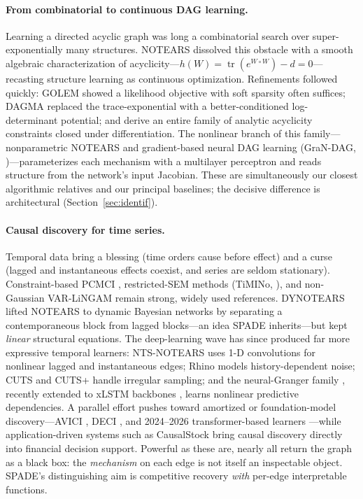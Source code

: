 \paragraph{From combinatorial to continuous DAG learning.} Learning a directed
acyclic graph was long a combinatorial search over super-exponentially many
structures. NOTEARS \citep{Zheng2018} dissolved this obstacle with a smooth
algebraic characterization of acyclicity---$h(W)=\operatorname{tr}(e^{W\circ
W})-d=0$---recasting structure learning as continuous optimization. Refinements
followed quickly: GOLEM \citep{ng2020golem} showed a likelihood objective with
soft sparsity often suffices; DAGMA \citep{Bello2022} replaced the
trace-exponential with a better-conditioned log-determinant potential; and
\citet{zhang2025analytic} derive an entire family of analytic acyclicity
constraints closed under differentiation. The nonlinear branch of this
family---nonparametric NOTEARS \citep{zheng2020sparse} and gradient-based neural
DAG learning (GraN-DAG, \citealt{lachapelle2020grandag})---parameterizes each
mechanism with a multilayer perceptron and reads structure from the network's
input Jacobian. These are simultaneously our closest algorithmic relatives and
our principal baselines; the decisive difference is architectural
(Section~\ref{sec:identif}).

\paragraph{Causal discovery for time series.} Temporal data bring a blessing
(time orders cause before effect) and a curse (lagged and instantaneous effects
coexist, and series are seldom stationary). Constraint-based PCMCI
\citep{Runge2019}, restricted-SEM methods (TiMINo, \citealt{Peters2013TiMINo}),
and non-Gaussian VAR-LiNGAM \citep{Hyvarinen2010} remain strong, widely used
references. DYNOTEARS \citep{Pamfil2020} lifted NOTEARS to dynamic Bayesian
networks by separating a contemporaneous block from lagged blocks---an idea SPADE
inherits---but kept \emph{linear} structural equations. The deep-learning wave has
since produced far more expressive temporal learners: NTS-NOTEARS
\citep{sun2023ntsnotears} uses 1-D convolutions for nonlinear lagged and
instantaneous edges; Rhino \citep{Gong2023Rhino} models history-dependent noise;
CUTS and CUTS+ \citep{Cheng2023CUTS,cheng2024cutsplus} handle irregular sampling;
and the neural-Granger family \citep{Tank2021,Shojaie2022,zhou2024jacobian},
recently extended to xLSTM backbones \citep{poonia2025gcxlstm}, learns nonlinear
predictive dependencies. A parallel effort pushes toward amortized or
foundation-model discovery---AVICI \citep{lorch2022avici}, DECI
\citep{geffner2022deci}, and 2024--2026 transformer-based learners
\citep{stein2024causalpretraining,shen2024stic,misiakos2025spinsvar,faruque2026ttcd,fesanghary2026grace}---while
application-driven systems such as CausalStock \citep{li2024causalstock} bring
causal discovery directly into financial decision support. Powerful as these are,
nearly all return the graph as a black box: the \emph{mechanism} on each edge is
not itself an inspectable object. SPADE's distinguishing aim is competitive
recovery \emph{with} per-edge interpretable functions.

